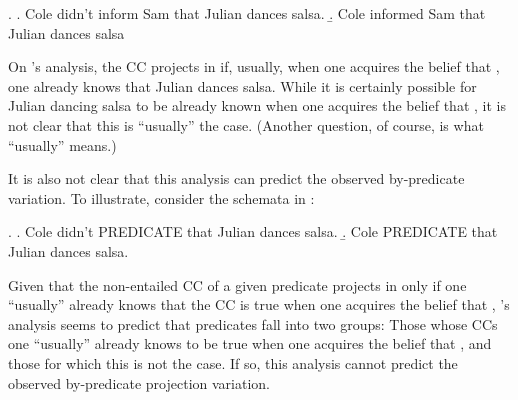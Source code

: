\documentclass[a4paper,12pt,twoside]{article}
\newcommand{\poscite}[1]{\citeauthor{#1}'s \citeyear{#1}}
\begin{document}
   \ex. \a. Cole didn't inform Sam that Julian dances salsa.
       \b. Cole informed Sam that Julian dances salsa

On \poscite{schlenker_triggering_2021} analysis, the CC projects in \Last[a] if, usually, when one acquires the belief that \Last[b], one already knows that Julian dances salsa. While it is certainly possible for Julian dancing salsa to be already known when one acquires the belief that \Last[b], it is not clear that this is ``usually'' the case. (Another question, of course, is what ``usually'' means.) 

It is also not clear that this analysis can predict the observed by-predicate variation. To illustrate, consider the schemata in \Next:

\ex. \a. Cole didn't PREDICATE that Julian dances salsa.
    \b. Cole PREDICATE that Julian dances salsa.

Given that the non-entailed CC of a given predicate projects in \Last[a] only if one ``usually'' already knows that the CC is true when one acquires the belief that \Last[b], \poscite{schlenker_triggering_2021} analysis seems to predict that predicates fall into two groups: Those whose CCs one ``usually'' already knows to be true when one acquires the belief that \Last[b], and those for which this is not the case. If so, this analysis cannot predict the observed by-predicate projection variation.

   
   
   
\end{document}

